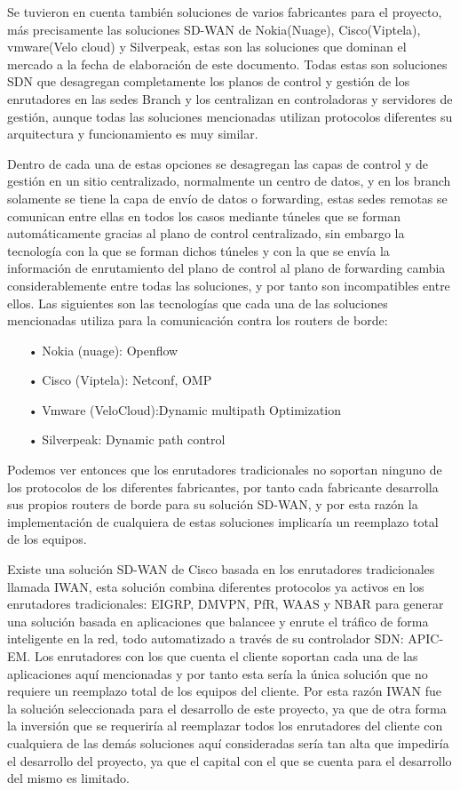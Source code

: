 Se tuvieron en cuenta también soluciones de varios fabricantes para el proyecto, más precisamente las soluciones SD-WAN de Nokia(Nuage), Cisco(Viptela), vmware(Velo cloud) y Silverpeak, estas son las soluciones que dominan el mercado a la fecha de elaboración de este documento. Todas estas son soluciones SDN que desagregan completamente los planos de control y gestión de los enrutadores en las sedes Branch y los centralizan en controladoras y servidores de gestión, aunque todas las soluciones mencionadas utilizan protocolos diferentes su arquitectura y funcionamiento es muy similar.

Dentro de cada una de estas opciones se desagregan las capas de control y de gestión en un sitio centralizado, normalmente un centro de datos, y en los branch solamente se tiene la capa de envío de datos o forwarding, estas sedes remotas se comunican entre ellas en todos los casos mediante túneles que se forman automáticamente gracias al plano de control centralizado, sin embargo la tecnología con la que se forman dichos túneles y con la que se envía la información de enrutamiento del plano de control al plano de forwarding cambia considerablemente entre todas las soluciones, y por tanto son incompatibles entre ellos. Las siguientes son las tecnologías que cada una de las soluciones mencionadas utiliza para la comunicación contra los routers de borde:

\begin{itemize}
\item[•]Nokia (nuage): Openflow
\item[•]Cisco (Viptela): Netconf, OMP
\item[•]Vmware (VeloCloud):Dynamic multipath Optimization
\item[•]Silverpeak: Dynamic path control
\end{itemize}

Podemos ver entonces que los enrutadores tradicionales no soportan ninguno de los protocolos de los diferentes fabricantes, por tanto cada fabricante desarrolla sus propios routers de borde para su solución SD-WAN, y por esta razón la implementación de cualquiera de estas soluciones implicaría un reemplazo total de los equipos.

Existe una solución SD-WAN de Cisco basada en los enrutadores tradicionales llamada IWAN, esta solución combina diferentes protocolos ya activos en los enrutadores tradicionales: EIGRP, DMVPN, PfR, WAAS y NBAR para generar una solución basada en aplicaciones que balancee y enrute el tráfico de forma inteligente en la red, todo automatizado a través de su controlador SDN: APIC-EM. Los enrutadores con los que cuenta el cliente soportan cada una de las aplicaciones aquí mencionadas y por tanto esta sería la única solución que no requiere un reemplazo total de los equipos del cliente.
Por esta razón IWAN fue la solución seleccionada para el desarrollo de este proyecto, ya que de otra forma la inversión que se requeriría al reemplazar todos los enrutadores del cliente con cualquiera de las demás soluciones aquí consideradas sería tan alta que impediría el desarrollo del proyecto, ya que el capital con el que se cuenta para el desarrollo del mismo es limitado.

